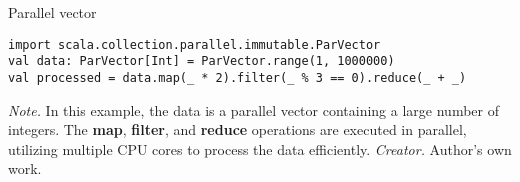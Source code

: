 \begin{table}[h!]
\caption{Parallel vector}
\begin{lstlisting}
import scala.collection.parallel.immutable.ParVector
val data: ParVector[Int] = ParVector.range(1, 1000000)
val processed = data.map(_ * 2).filter(_ % 3 == 0).reduce(_ + _)
\end{lstlisting}
\small
\textit{Note.} In this example, the data is a parallel vector containing a large number of integers. The \textbf{map}, \textbf{filter}, and \textbf{reduce} operations are executed in parallel, utilizing multiple CPU cores to process the data efficiently.
\textit{Creator.} Author's own work.
\end{table}